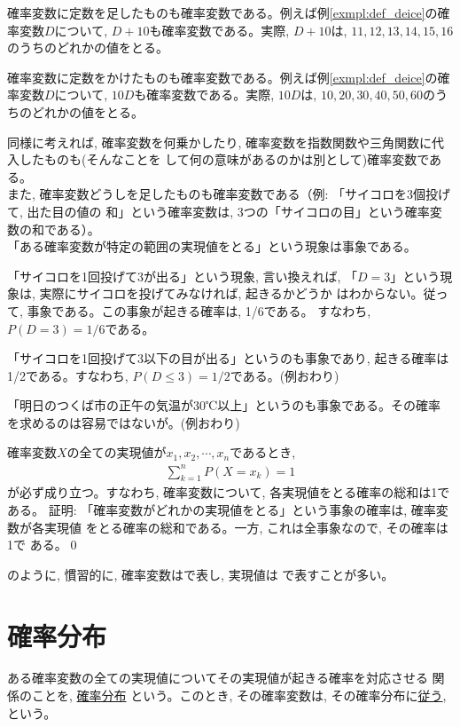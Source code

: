 確率変数に定数を足したものも確率変数である。例えば例\ref{exmpl:def_deice}の確率変数$D$について, 
$D+10$も確率変数である。実際, $D+10$は, $11, 12, 13, 14, 15, 16$のうちのどれかの値をとる。

確率変数に定数をかけたものも確率変数である。例えば例\ref{exmpl:def_deice}の確率変数$D$について, 
$10D$も確率変数である。実際, $10D$は, $10, 20, 30, 40, 50, 60$のうちのどれかの値をとる。

同様に考えれば, 確率変数を何乗かしたり, 確率変数を指数関数や三角関数に代入したものも(そんなことを
して何の意味があるのかは別として)確率変数である。\\

また, 確率変数どうしを足したものも確率変数である（例: 「サイコロを3個投げて, 出た目の値の
和」という確率変数は, 3つの「サイコロの目」という確率変数の和である）。\\

「ある確率変数が特定の範囲の実現値をとる」という現象は事象である。

\begin{exmpl} 「サイコロを1回投げて3が出る」という現象, 言い換えれば, 
「$D=3$」という現象は, 実際にサイコロを投げてみなければ, 起きるかどうか
はわからない。従って, 事象である。この事象が起きる確率は, 1/6である。
すなわち, $P(D=3)=1/6$である。

「サイコロを1回投げて3以下の目が出る」というのも事象であり, 
起きる確率は1/2である。すなわち, $P(D\leq3)=1/2$である。(例おわり)\end{exmpl}

\begin{exmpl} 「明日のつくば市の正午の気温が30℃以上」というのも事象である。その確率
を求めるのは容易ではないが。(例おわり)\end{exmpl}

確率変数$X$の全ての実現値が$x_1, x_2, \cdots, x_n$であるとき, 
\begin{eqnarray}
\sum_{k=1}^{n}P(X=x_k)=1\label{eq:probsumeq1}
\end{eqnarray}
が必ず成り立つ。すなわち, 確率変数について, 各実現値をとる確率の総和は1である。
証明: 「確率変数がどれかの実現値をとる」という事象の確率は, 確率変数が各実現値
をとる確率の総和である。一方, これは全事象なので, その確率は1で
ある。\qed

のように, 慣習的に, 
確率変数はで表し, 実現値は
で表すことが多い。
\vv

\section{確率分布}
ある確率変数の全ての実現値についてその実現値が起きる確率を対応させる
関係のことを, \underline{確率分布}
という。このとき, その確率変数は, その確率分布に\underline{従う}, 
という。


